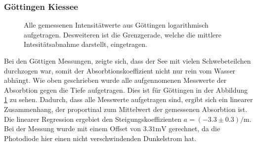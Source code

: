 \documentclass[12pt,a4paper,titlepage,headinclude,bibtotoc]{scrartcl}
\numberwithin{equation}{subsection}
\begin{document}
\subsubsection{Göttingen Kiessee}
\begin{figure}[!htb]
	\centering
	
	\caption{Alle gemessenen Intensitätwerte aus Göttingen logarithmisch aufgetragen. Desweiteren ist die Grenzgerade, welche die mittlere Intesitätsabnahme darstellt, eingetragen.}
	\label{fig:lichtGoe}
\end{figure}
Bei den Göttigen Messungen, zeigte sich, dass der See mit vielen Schwebeteilchen durchzogen war, somit der Absorbtionskoeffizient nicht nur rein vom Wasser abhängt.
Wie oben geschrieben wurde alle aufgennomenen Messwerte der Absorbtion gegen die Tiefe aufgetragen.
Dies ist für Göttingen in der Abbildung \ref{fig:lichtGoe} zu sehen.
Dadurch, dass alle Messwerte aufgetragen sind, ergibt sich ein linearer Zusammenhang, der proportinal zum Mittelwert der gemessenen Absorbtion ist.
Die linearer Regression ergebiet den Steigungskoeffizienten $a=(-3.3\pm0.3)\si{\per\meter}$.
Bei der Messung wurde mit einem Offset von $3.31\si{\milli\volt}$ gerechnet, da die Photodiode hier einen nicht verschwindenden Dunkelstrom hat.
\end{document}
